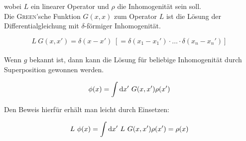 wobei $L$ ein linearer Operator und $\rho$ die Inhomogenität sein soll.\
\\
Die \textsc{Green}'sche Funktion $G(x,x)$ zum Operator $L$ ist die Lösung der Differentialgleichung mit $\delta$-förmiger Inhomogenität.

\begin{equation*}
L \ G(x,x') = \delta (x-x') \; [= \delta(x_1-x_1')\cdot\dotsc\cdot\delta(x_n - x_n')]
\end{equation*}
\ \\
Wenn $g$ bekannt ist, dann kann die Lösung für beliebige Inhomogenität durch Superposition gewonnen werden.

\begin{equation*}
\phi (x) = \int\mathrm{d} x' \ G(x,x') \rho(x')
\end{equation*}

Den Beweis hierfür erhält man leicht durch Einsetzen:

\begin{equation*}
L \ \phi(x) = \int\mathrm{d} x' \ L \ G(x,x') \rho(x') = \rho(x)
\end{equation*}

